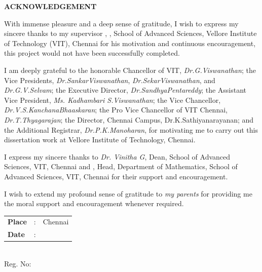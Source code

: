 
\thispagestyle{plain}
\begin{center}
	{\Large \bf \MakeUppercase{Acknowledgement}}
\end{center}

With immense pleasure and a deep sense of gratitude, I wish to express my sincere thanks to my supervisor \emph{\theguide}, \theguidedesignation, School of Advanced Sciences, Vellore Institute of Technology (VIT), Chennai for his motivation and continuous encouragement, this project would not have been successfully completed.

I am deeply grateful to the honorable Chancellor of VIT, {\em Dr.\;G.\;Viswanathan}; the Vice Presidents, 
{\em Dr.\;Sankar\;Viswanathan}, {\em Dr.\;Sekar\;Viswanathan}, and {\em Dr.\;G.\;V.\;Selvam}; the Executive 
Director, {\em Dr.\;Sandhya\;Pentareddy}; the Assistant Vice President,  {\em Ms. Kadhambari S.\;Viswanathan}; 
the Vice Chancellor, {\em Dr.\;V.\;S.\;Kanchana\;Bhaaskaran}; the Pro Vice Chancellor of VIT Chennai, 
{\em Dr.\;T.\;Thyagarajan}; the Director, Chennai Campus, Dr.\;K.\;Sathiyanarayanan; and the Additional Registrar, {\em Dr.\;P.\;K.\;Manoharan}, for motivating me to carry 
out this dissertation work at Vellore Institute of Technology, Chennai.

 I express my sincere thanks to {\em Dr. Vinitha G}, Dean, School of Advanced Sciences, VIT, Chennai and {\em \thehod}, Head, Department of Mathematics, School of Advanced Sciences,  VIT, Chennai for their support and encouragement.


 I wish to extend my profound sense of gratitude to {\em my parents} for providing me the moral support and encouragement whenever required.   



\vspace{3\baselineskip}

\begingroup
\linespread{1} \selectfont

\begin{minipage}{.5\textwidth}
	\raggedright
	\begin{tabular}{lcl}
		\textbf{Place}  & : & Chennai \\
		\textbf{Date} & : &
	\end{tabular}
\end{minipage}%
\begin{minipage}{.5\textwidth}
		\raggedleft
		\thestudent\\
		Reg. No: \theregno\\
\end{minipage}

 \endgroup
